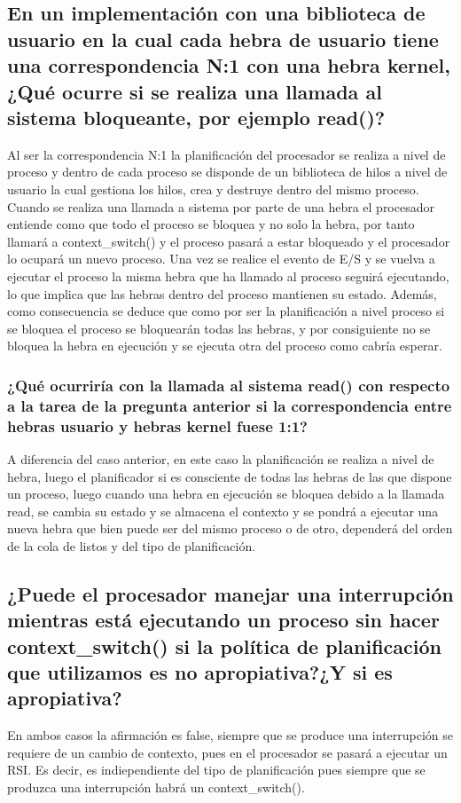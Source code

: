 \documentclass{article}
\begin{document}
				\subsection*{En un implementación con una biblioteca de usuario en la cual cada hebra de usuario tiene una correspondencia N:1 con una hebra kernel, ¿Qué ocurre si se realiza una llamada al sistema bloqueante, por ejemplo read()?}
					Al ser la correspondencia N:1 la planificación del procesador se realiza a nivel de proceso y dentro de cada proceso se disponde de un biblioteca de hilos a nivel de usuario la cual gestiona los hilos, crea y destruye dentro del mismo proceso. Cuando se realiza una llamada a sistema por parte de una hebra el procesador entiende como que todo el proceso se bloquea y no solo la hebra, por tanto llamará a context\_switch() y el proceso pasará a estar bloqueado y el procesador lo ocupará un nuevo proceso. Una vez se realice el evento de E/S y se vuelva a ejecutar el proceso la misma hebra que ha llamado al proceso seguirá ejecutando, lo que implica que las hebras dentro del proceso mantienen su estado. Además, como consecuencia se deduce que como por ser la planificación a nivel proceso si se bloquea el proceso se bloquearán todas las hebras, y por consiguiente no se bloquea la hebra en ejecución y se ejecuta otra del proceso como cabría esperar.
					
				\subsubsection*{¿Qué ocurriría con la llamada al sistema read() con respecto a la tarea de la pregunta anterior si la correspondencia entre hebras usuario y hebras kernel fuese 1:1?}
					A diferencia del caso anterior, en este caso la planificación se realiza a nivel de hebra, luego el planificador si es consciente de todas las hebras de las que dispone un proceso, luego cuando una hebra en ejecución se bloquea debido a la llamada read, se cambia su estado y se almacena el contexto y se pondrá a ejecutar una nueva hebra que bien puede ser del mismo proceso o de otro, dependerá del orden de la cola de listos y del tipo de planificación.
					
			\subsection[Pregunta 6]{¿Puede el procesador manejar una interrupción mientras está ejecutando un proceso sin hacer context\_switch() si la política de planificación que utilizamos es no apropiativa?¿Y si es apropiativa?}
				En ambos casos la afirmación es false, siempre que se produce una interrupción se requiere de un cambio de contexto, pues en el procesador se pasará a ejecutar un RSI. Es decir, es indiependiente del tipo de planificación pues siempre que se produzca una interrupción habrá un context\_switch().
				
\end{document}
